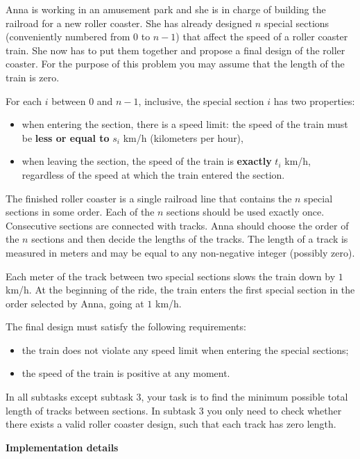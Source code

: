 Anna is working in an amusement park and she is in charge of building the railroad for a new roller coaster. She has already designed $n$ special sections (conveniently numbered from $0$ to $n - 1$) that affect the speed of a roller coaster train. She now has to put them together and propose a final design of the roller coaster. For the purpose of this problem you may assume that the length of the train is zero.

For each $i$ between $0$ and $n - 1$, inclusive, the special section $i$ has two properties:
\begin{itemize}
\item when entering the section, there is a speed limit: the speed of the train must be \textbf{less or equal to} $s_i$ km/h (kilometers per hour),
\item when leaving the section, the speed of the train is \textbf{exactly} $t_i$ km/h, regardless of the speed at which the train entered the section.
\end{itemize}

The finished roller coaster is a single railroad line that contains the $n$ special sections in some order. Each of the $n$ sections should be used exactly once. Consecutive sections are connected with tracks. Anna should choose the order of the $n$ sections and then decide the lengths of the tracks. The length of a track is measured in meters and may be equal to any non-negative integer (possibly zero).

Each meter of the track between two special sections slows the train down by $1$ km/h. At the beginning of the ride, the train enters the first special section in the order selected by Anna, going at $1$ km/h. 

The final design must satisfy the following requirements:
\begin{itemize}
\item the train does not violate any speed limit when entering the special sections;
\item the speed of the train is positive at any moment.
\end{itemize}

In all subtasks except subtask 3, your task is to find the minimum possible total length of tracks between sections. In subtask 3 you only need to check whether there exists a valid roller coaster design, such that each track has zero length.

\textbf{Implementation details}

